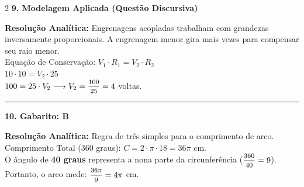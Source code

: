 \documentclass[11pt, a4paper]{article}
\begin{document}
\begin{multicols*}{2}
\textbf{9. Modelagem Aplicada (Questão Discursiva)}
\begin{boxresponda}
\textbf{Resolução Analítica:} Engrenagens acopladas trabalham com grandezas inversamente proporcionais. A engrenagem menor gira mais vezes para compensar seu raio menor.
\\[0.1cm]
Equação de Conservação: $V_1 \cdot R_1 = V_2 \cdot R_2$
\\[0.1cm]
$10 \cdot 10 = V_2 \cdot 25$
\\[0.1cm]
$100 = 25 \cdot V_2 \longrightarrow V_2 = \mfrac{100}{25} = 4$ voltas.
\end{boxresponda}

\vspace{0.4cm}
\noindent\textcolor{CorLinha}{\rule{\linewidth}{0.5pt}} 
\vspace{0.2cm}

\textbf{10. Gabarito: \textcolor{CorGabarito}{B}}
\begin{boxresponda}
\textbf{Resolução Analítica:} Regra de três simples para o comprimento de arco.
\\[0.1cm]
Comprimento Total (360 graus): $C = 2 \cdot \pi \cdot 18 = 36\pi$ cm.
\\[0.1cm]
O ângulo de \textbf{40 graus} representa a nona parte da circunferência ($\mfrac{360}{40} = 9$). 
\\[0.1cm]
Portanto, o arco mede: $\mfrac{36\pi}{9} = 4\pi$ cm.
\end{boxresponda}

\end{multicols*}
\end{document}
